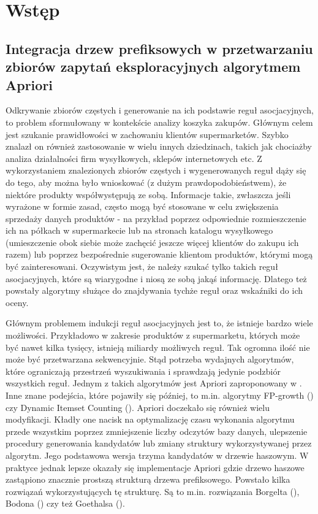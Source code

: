 \chapter{Wstęp}
\label{c1}

\section{Integracja drzew prefiksowych w przetwarzaniu zbiorów zapytań eksploracyjnych algorytmem Apriori}
\label{c11}


Odkrywanie zbiorów częstych i generowanie na ich podstawie reguł asocjacyjnych, to problem sformułowany w kontekście analizy koszyka zakupów. Głównym celem jest szukanie prawidłowości w zachowaniu klientów supermarketów. Szybko znalazł on również zastosowanie w wielu innych dziedzinach, takich jak chociażby analiza działalności firm wysyłkowych, sklepów internetowych etc. Z wykorzystaniem znalezionych zbiorów częstych i wygenerowanych reguł dąży się do tego, aby można było wnioskować (z dużym prawdopodobieństwem), że niektóre produkty współwystępują ze sobą. Informacje takie, zwłaszcza jeśli wyrażone w formie zasad, często mogą być stosowane w celu zwiększenia sprzedaży danych produktów - na przykład poprzez odpowiednie rozmieszczenie ich na półkach w supermarkecie lub na stronach katalogu wysyłkowego (umieszczenie obok siebie może zachęcić jeszcze więcej klientów do zakupu ich razem) lub poprzez bezpośrednie sugerowanie klientom produktów, którymi mogą być zainteresowani. Oczywistym jest, że należy szukać tylko takich reguł asocjacyjnych, które są wiarygodne i niosą ze sobą jakąś informację. Dlatego też powstały algorytmy służące do znajdywania tychże reguł oraz wskaźniki do ich oceny.

Głównym problemem indukcji reguł asocjacyjnych jest to, że istnieje bardzo wiele możliwości. Przykładowo w zakresie produktów z supermarketu, których może być nawet kilka tysięcy, istnieją miliardy możliwych reguł. Tak ogromna ilość nie może być przetwarzana sekwencyjnie. Stąd potrzeba wydajnych algorytmów, które ograniczają przestrzeń wyszukiwania i sprawdzają jedynie podzbiór wszystkich reguł. Jednym z takich algorytmów jest Apriori zaproponowany w \cite{Agrawal}. Inne znane podejścia, które pojawiły się później, to m.in. algorytmy FP-growth (\cite{Han}) czy Dynamic Itemset Counting (\cite{Brin}). Apriori doczekało się również wielu modyfikacji. Kładły one nacisk na optymalizację czasu wykonania algorytmu przede wszystkim poprzez zmniejszenie liczby odczytów bazy danych, ulepszenie procedury generowania kandydatów lub zmiany struktury wykorzystywanej przez algorytm. Jego podstawowa wersja trzyma kandydatów w drzewie haszowym. W praktyce jednak lepsze okazały się implementacje Apriori gdzie drzewo haszowe zastąpiono znacznie prostszą strukturą drzewa prefiksowego. Powstało kilka rozwiązań wykorzystujących tę strukturę. Są to m.in. rozwiązania Borgelta (\cite{Borgelt}), Bodona (\cite{Bodon}) czy też Goethalsa (\cite{Goethals}).


